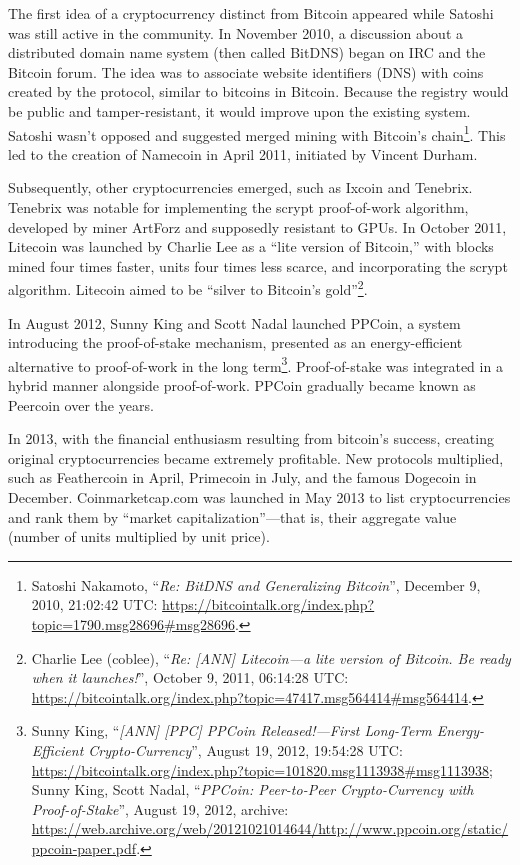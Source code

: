 \documentclass[
  a5paper,
  smalldemyvopaper,10pt,twoside,onecolumn,openright,extrafontsizes,hidelinks]{memoir}
\begin{document}
The first idea of a cryptocurrency distinct from Bitcoin appeared while
Satoshi was still active in the community. In November 2010, a
discussion about a distributed domain name system (then called BitDNS)
began on IRC and the Bitcoin forum. The idea was to associate website
identifiers (DNS) with coins created by the protocol, similar to
bitcoins in Bitcoin. Because the registry would be public and
tamper-resistant, it would improve upon the existing system. Satoshi
wasn't opposed and suggested merged mining with Bitcoin's
chain\footnote{Satoshi Nakamoto, ``\emph{Re: BitDNS and Generalizing
  Bitcoin}'', December 9, 2010, 21:02:42 UTC:
  \url{https://bitcointalk.org/index.php?topic=1790.msg28696\#msg28696}.}.
This led to the creation of Namecoin in April 2011, initiated by Vincent
Durham.

Subsequently, other cryptocurrencies emerged, such as Ixcoin and
Tenebrix. Tenebrix was notable for implementing the scrypt proof-of-work
algorithm, developed by miner ArtForz and supposedly resistant to GPUs.
In October 2011, Litecoin was launched by Charlie Lee as a ``lite
version of Bitcoin,'' with blocks mined four times faster, units four
times less scarce, and incorporating the scrypt algorithm. Litecoin
aimed to be ``silver to Bitcoin's gold''\footnote{Charlie Lee (coblee),
  ``\emph{Re: {[}ANN{]} Litecoin---a lite version of Bitcoin. Be ready
  when it launches!}'', October 9, 2011, 06:14:28 UTC:
  \url{https://bitcointalk.org/index.php?topic=47417.msg564414\#msg564414}.}.

In August 2012, Sunny King and Scott Nadal launched PPCoin, a system
introducing the proof-of-stake mechanism, presented as an
energy-efficient alternative to proof-of-work in the long
term\footnote{Sunny King, ``\emph{{[}ANN{]} {[}PPC{]} PPCoin
  Released!---First Long-Term Energy-Efficient Crypto-Currency}'',
  August 19, 2012, 19:54:28 UTC:
  \url{https://bitcointalk.org/index.php?topic=101820.msg1113938\#msg1113938};
  Sunny King, Scott Nadal, ``\emph{PPCoin: Peer-to-Peer Crypto-Currency
  with Proof-of-Stake}'', August 19, 2012, archive:
  \url{https://web.archive.org/web/20121021014644/http://www.ppcoin.org/static/ppcoin-paper.pdf}.}.
Proof-of-stake was integrated in a hybrid manner alongside
proof-of-work. PPCoin gradually became known as Peercoin over the years.

In 2013, with the financial enthusiasm resulting from bitcoin's success,
creating original cryptocurrencies became extremely profitable. New
protocols multiplied, such as Feathercoin in April, Primecoin in July,
and the famous Dogecoin in December. Coinmarketcap.com was launched in
May 2013 to list cryptocurrencies and rank them by ``market
capitalization''---that is, their aggregate value (number of units
multiplied by unit price).
\end{document}

